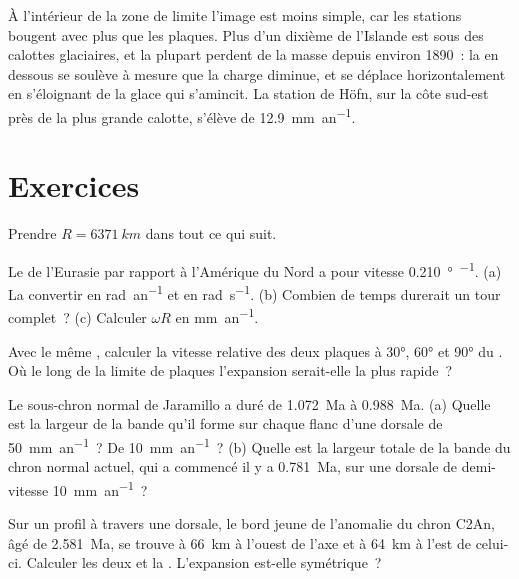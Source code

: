 À l'intérieur de la zone de limite l'image est moins simple, car les stations bougent
avec plus que les plaques. Plus d'un dixième de l'Islande est sous des calottes glaciaires, et
la plupart perdent de la masse depuis environ 1890~: la  en dessous se soulève à mesure que
la charge diminue, et se déplace horizontalement en s'éloignant de la glace qui s'amincit. La
station de Höfn, sur la côte sud-est près de la plus grande calotte, s'élève de
\qty{12.9}{mm.an^{-1}}.

\section{Exercices}

Prendre $R = \qty{6371}{km}$ dans tout ce qui suit.

\begin{exercise}[$\star$]\label{exo:b1:plate-kinematics:1}
Le  de l'Eurasie par rapport à l'Amérique du Nord a pour vitesse
\qty{0.210}{\degree\per\Ma}. (a) La convertir en \unit{rad.an^{-1}} et en
\unit{rad.s^{-1}}. (b) Combien de temps durerait un tour complet~? (c) Calculer $\omega R$ en
\unit{mm.an^{-1}}.
\end{exercise}

\begin{exercise}[$\star$]\label{exo:b1:plate-kinematics:2}
Avec le même , calculer la vitesse relative des deux plaques à
\ang{30}, \ang{60} et \ang{90} du . Où le long de la limite de
plaques l'expansion serait-elle la plus rapide~?
\end{exercise}

\begin{exercise}[$\star$]\label{exo:b1:plate-kinematics:3}
Le sous-chron normal de Jaramillo a duré de \qty{1.072}{Ma} à \qty{0.988}{Ma}.
(a) Quelle est la largeur de la bande qu'il forme sur chaque flanc d'une dorsale de
 \qty{50}{mm.an^{-1}}~? De \qty{10}{mm.an^{-1}}~? (b) Quelle est la
largeur totale de la bande du chron normal actuel, qui a commencé
il y a \qty{0.781}{Ma}, sur une dorsale de demi-vitesse \qty{10}{mm.an^{-1}}~?
\end{exercise}

\begin{exercise}[$\star$]\label{exo:b1:plate-kinematics:4}
Sur un profil à travers une dorsale, le bord jeune de l'anomalie du chron C2An,
âgé de \qty{2.581}{Ma}, se trouve à \qty{66}{km} à l'ouest de l'axe et à \qty{64}{km} à l'est
de celui-ci. Calculer les deux  et la .
L'expansion est-elle symétrique~?
\end{exercise}

